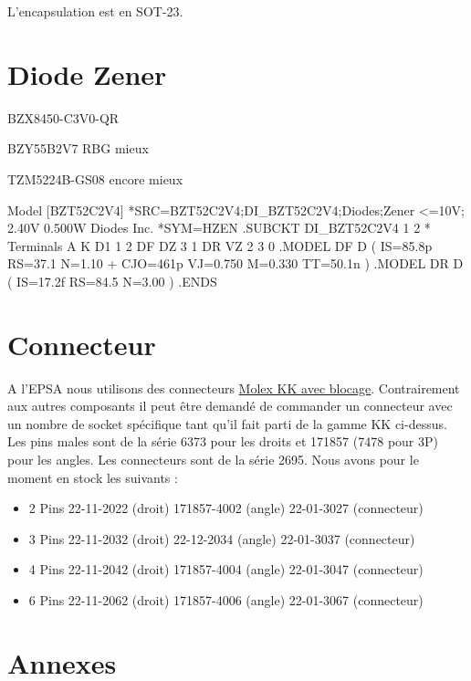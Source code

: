 \documentclass{EPSA-rap-template}
\begin{document}
L'encapsulation est en SOT-23.

\section{Diode Zener}

BZX8450-C3V0-QR

BZY55B2V7 RBG mieux

TZM5224B-GS08 encore mieux

Model
[BZT52C2V4]
*SRC=BZT52C2V4;DI_BZT52C2V4;Diodes;Zener <=10V; 2.40V  0.500W   Diodes Inc. 
*SYM=HZEN
.SUBCKT DI_BZT52C2V4  1 2
*        Terminals    A   K
D1 1 2 DF
DZ 3 1 DR
VZ 2 3 0
.MODEL DF D ( IS=85.8p RS=37.1 N=1.10
+ CJO=461p VJ=0.750 M=0.330 TT=50.1n )
.MODEL DR D ( IS=17.2f RS=84.5 N=3.00 )
.ENDS

\section{Connecteur}

A l'EPSA nous utilisons des connecteurs \href{https://www.mouser.fr/c/connectors/headers-wire-housings/?contact\%20gender=Pin\%20\%28Male\%29&contact\%20plating=Gold&m=Molex&mating\%20post\%20length=7.49\%20mm&mounting\%20angle=Straight&number\%20of\%20rows=1\%20Row&pitch=2.54\%20mm&termination\%20post\%20length=3.56\%20mm&type=Locking}{Molex KK avec blocage}. Contrairement aux autres composants il peut être demandé de commander un connecteur avec un nombre de socket spécifique tant qu'il fait parti de la gamme KK ci-dessus. Les pins males sont de la série 6373 pour les droits et 171857 (7478 pour 3P) pour les angles. Les connecteurs sont de la série 2695.  Nous avons pour le moment en stock les suivants :



\begin{itemize}
\item 2 Pins 22-11-2022 (droit) 171857-4002 (angle) 22-01-3027 (connecteur)
\item 3 Pins 22-11-2032 (droit) 22-12-2034 (angle) 22-01-3037 (connecteur)
\item 4 Pins 22-11-2042 (droit) 171857-4004 (angle) 22-01-3047 (connecteur)
\item 6 Pins 22-11-2062 (droit) 171857-4006 (angle) 22-01-3067 (connecteur)
\end{itemize}

\section{Annexes}
\end{document}

